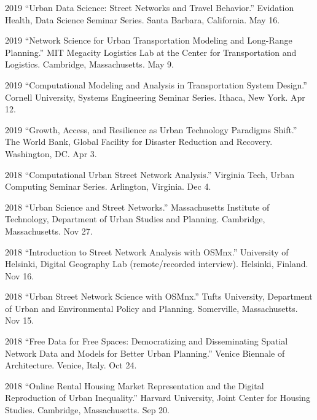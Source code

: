 \documentclass[12pt,letterpaper]{report}
\begin{document}
    \begin{tablist}

        \item[2019] \tab \enquote{Urban Data Science: Street Networks and Travel Behavior.} Evidation Health, Data Science Seminar Series. Santa Barbara, California. May 16.
        
        \item[2019] \tab \enquote{Network Science for Urban Transportation Modeling and Long-Range Planning.} MIT Megacity Logistics Lab at the Center for Transportation and Logistics. Cambridge, Massachusetts. May 9.

        \item[2019] \tab \enquote{Computational Modeling and Analysis in Transportation System Design.} Cornell University, Systems Engineering Seminar Series. Ithaca, New York. Apr 12.

        \item[2019] \tab \enquote{Growth, Access, and Resilience as Urban Technology Paradigms Shift.} The World Bank, Global Facility for Disaster Reduction and Recovery. Washington, DC. Apr 3.

        \item[2018] \tab \enquote{Computational Urban Street Network Analysis.} Virginia Tech, Urban Computing Seminar Series. Arlington, Virginia. Dec 4.

        \item[2018] \tab \enquote{Urban Science and Street Networks.} Massachusetts Institute of Technology, Department of Urban Studies and Planning. Cambridge, Massachusetts. Nov 27.
        
        \item[2018] \tab \enquote{Introduction to Street Network Analysis with OSMnx.} University of Helsinki, Digital Geography Lab (remote/recorded interview). Helsinki, Finland. Nov 16.

        \item[2018] \tab \enquote{Urban Street Network Science with OSMnx.} Tufts University, Department of Urban and Environmental Policy and Planning. Somerville, Massachusetts. Nov 15.

        \item[2018] \tab \enquote{Free Data for Free Spaces: Democratizing and Disseminating Spatial Network Data and Models for Better Urban Planning.} Venice Biennale of Architecture. Venice, Italy. Oct 24.

        \item[2018] \tab \enquote{Online Rental Housing Market Representation and the Digital Reproduction of Urban Inequality.} Harvard University, Joint Center for Housing Studies. Cambridge, Massachusetts. Sep 20.


\end{tablist}
\end{document}
